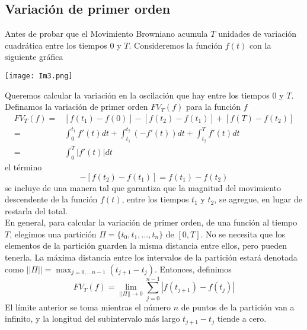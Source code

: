 \documentclass[11pt,notitlepage]{article}
\begin{document}
\subsection{Variación de primer orden}
Antes de probar que el Movimiento Browniano acumula \(T\) unidades de variación cuadrática entre los tiempos \(0\) y \(T\). Consideremos la función \(f(t)\) con la siguiente gráfica
\begin{center}
  \texttt{[image: Im3.png]}  
\end{center}
Queremos calcular la variación en la oscilación que hay entre los tiempos \(0\) y \(T\). Definamos la variación de primer orden \(FV_T(f)\) para la función \(f\)
\begin{equation} \label{3.4.2}
    \begin{split}
      FV_T(f)=& [f(t_1)-f(0)]  - [f(t_2)-f(t_1)] + [f(T)-f(t_2)] \\
      =& \int_0^{t_1} f'(t)dt+ \int_{t_1}^{t_2}(-f'(t))dt+ \int_{t_2}^T  f'(t)dt\\
      =& \int_{0}^T |f'(t)|dt
    \end{split}
\end{equation}
el término 
\[-[f(t_2)-f(t_1)]= f(t_1)-f(t_2) \]
se incluye de una manera tal que garantiza que la magnitud del movimiento descendente de la función \(f(t)\), entre los tiempos \(t_1\) y \(t_2\), se agregue, en lugar de restarla del total.\\

En general, para calcular la variación de primer orden, de una función al tiempo \(T\), elegimos una partición \(\Pi=\{t_0, t_1,...,t_n\}\) de \([0,T]\). No se necesita que los elementos de la partición guarden la misma distancia entre ellos, pero pueden tenerla. La máxima distancia entre los intervalos de la partición estará denotada como \(||\Pi||=\max_{j=0,...n-1}(t_{j+1}-t_j)\). Entonces, definimos 
\begin{equation} \label{3.4.3}
    FV_T(f)=\lim_{||\Pi|| \to 0} \sum_{j=0}^{n-1}|f(t_{j+1})-f(t_j)|
\end{equation}
El límite anterior se toma mientras el número \(n\) de puntos de la partición van a infinito, y la longitud del subintervalo más largo \(t_{j+1}-t_j\) tiende a cero.\\
\end{document}
